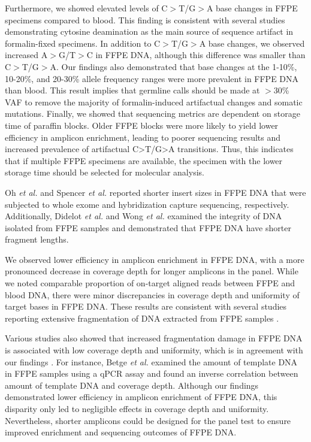Furthermore, we showed elevated levels of C$>$T/G$>$A base changes in FFPE specimens compared to blood. This finding is consistent with several studies demonstrating cytosine deamination as the main source of sequence artifact in formalin-fixed specimens. In addition to C$>$T/G$>$A base changes, we observed increased A$>$G/T$>$C in FFPE DNA, although this difference was smaller than C$>$T/G$>$A. Our findings also demonstrated that base changes at the 1-10\%, 10-20\%, and 20-30\% allele frequency ranges were more prevalent in FFPE DNA than blood. This result implies that germline calls should be made at $>$30\% VAF to remove the majority of formalin-induced artifactual changes and somatic mutations. Finally, we showed that sequencing metrics are dependent on storage time of paraffin blocks. Older FFPE blocks were more likely to yield lower efficiency in amplicon enrichment, leading to poorer sequencing results and increased prevalence of artifactual C>T/G>A transitions. Thus, this indicates that if multiple FFPE specimens are available, the specimen with the lower storage time should be selected for molecular analysis.




Oh \textit{et al.}\cite{Oh2015} and Spencer \textit{et al.}\cite{Spencer2013} reported shorter insert sizes in FFPE DNA that were subjected to whole exome and hybridization capture sequencing, respectively. Additionally, Didelot \textit{et al.}\cite{Didelot2013} and Wong \textit{et al.}\cite{Wong2013} examined the integrity of DNA isolated from FFPE samples and demonstrated that FFPE DNA have shorter fragment lengths.

We observed lower efficiency in amplicon enrichment in FFPE DNA, with a more pronounced decrease in coverage depth for longer amplicons in the panel. While we noted comparable proportion of on-target aligned reads between FFPE and blood DNA, there were minor discrepancies in coverage depth and uniformity of target bases in FFPE DNA. These results are consistent with several studies reporting extensive fragmentation of DNA extracted from FFPE samples \cite{Wong2014, Didelot2013, Oh2015, Wong2013, Betge2015, Spencer2013}.

Various studies also showed that increased fragmentation damage in FFPE DNA is associated with low coverage depth and uniformity, which is in agreement with our findings \cite{Wong2013, Wong2014, Didelot2013, Betge2015, Spencer2013}. For instance, Betge \textit{et al.}\cite{Betge2015} examined the amount of template DNA in FFPE samples using a qPCR assay and found an inverse correlation between amount of template DNA and coverage depth. Although our findings demonstrated lower efficiency in amplicon enrichment of FFPE DNA, this disparity only led to negligible effects in coverage depth and uniformity. Nevertheless, shorter amplicons could be designed for the panel test to ensure improved enrichment and sequencing outcomes of FFPE DNA.

